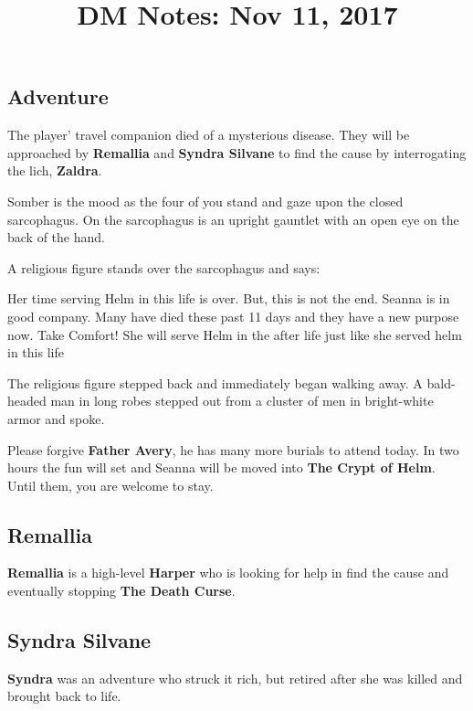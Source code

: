 \documentclass{dm}
\title{DM Notes: Nov 11, 2017}
\begin{document}
  \begin{cols}

  \killsectionspace{}
  \section{Adventure}
    The player' travel companion died of a mysterious disease.
    They will be approached by \textbf{Remallia} and \textbf{Syndra Silvane} to find the cause by interrogating the lich, \textbf{Zaldra}.

  \begin{content}
    Somber is the mood as the four of you stand and gaze upon the closed sarcophagus.
    On the sarcophagus is an upright gauntlet with an open eye on the back of the hand.

    A religious figure stands over the sarcophagus and says: 
    \begin{displayquote}
      Her time serving Helm in this life is over.
      But, this is not the end.
      Seanna is in good company.
      Many have died these past 11 days and they have a new purpose now.
      Take Comfort!
      She will serve Helm in the after life just like she served helm in this life
    \end{displayquote}

    The religious figure stepped back and immediately began walking away.
    A bald-headed man in long robes stepped out from a cluster of men in bright-white armor and spoke.
    \begin{displayquote}
      Please forgive \textbf{Father Avery}, he has many more burials to attend today.
      In two hours the fun will set and Seanna will be moved into \textbf{The Crypt of Helm}.
      Until them, you are welcome to stay.
    \end{displayquote}
  \end{content}

  \subsection{Remallia}
    \textbf{Remallia} is a high-level \textbf{Harper} who is looking for help in find the cause and eventually stopping \textbf{The Death Curse}.

  \subsection{Syndra Silvane}
    \textbf{Syndra} was an adventure who struck it rich, but retired after she was killed and brought back to life.


\end{cols}
\end{document}
